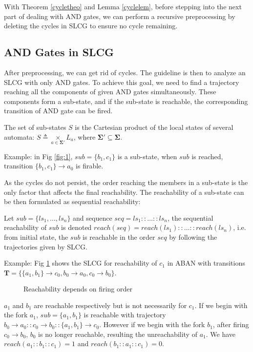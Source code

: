 \documentclass[runningheads]{llncs}
\newcommand{\acm}[3]{#1\rightarrow#2}
\newcommand{\ac}[3]{$#1\rightarrow#2$}
\begin{document}
With Theorem \ref{cycletheo} and Lemma \ref{cyclelem}, before stepping into the next part of dealing with AND gates, we can perform a recursive preprocessing by deleting the cycles in SLCG to ensure no cycle remaining.

\subsection{AND Gates in SLCG}\label{sectAndGates}
After preprocessing, we can get rid of cycles.
The guideline is then to analyze an SLCG with only AND gates.
To achieve this goal, we need to find a trajectory reaching all the components of given AND gates simultaneously.
These components form a sub-state, and if the sub-state is reachable, the corresponding transition of AND gate can be fired. 
\begin{definition}
The set of sub-states $S$ is the Cartesian product of the local states of several automata: $S\triangleq \underset{a\in \mathbf{\Sigma}'}{\times} L_a$, where $\mathbf{\Sigma}'\subseteq \mathbf{\Sigma}$.
\end{definition}

Example: in Fig \ref{fig:1}, $sub=\{ b_1,c_1\}$ is a sub-state, when $sub$ is reached, transition \ac{\{ b_1,c_1\}}{a_0}{a_1} is firable.

As the cycles do not persist, the order reaching the members in a sub-state is the only factor that affects the final reachability. 
The reachability of a sub-state can be then formulated as sequential reachability:
\begin{definition}
Let $sub=\{ls_1,\ldots,ls_n\}$ and sequence $seq=ls_1::\ldots::ls_n$, the sequential reachability of $sub$ is denoted $reach (seq)=reach (ls_1)::\ldots::reach (ls_n)$, i.e. from initial state, the $sub$ is reachable in the order $seq$ by following the trajectories given by SLCG.
\end{definition}

Example: Fig \ref{fig:5} shows the SLCG for reachability of $c_1$ in ABAN with transitions $\mathbf{T}=\{\acm{\{a_1,b_1\}}{c_0}{c_1},\acm{b_0}{a_0}{a_1},\acm{c_0}{b_0}{b_1}\}$.
\begin{figure}[ht]
\centering

\caption{Reachability depends on firing order}
\label{fig:5}
\end{figure}

$a_1$ and $b_1$ are reachable respectively but is not necessarily for $c_1$.
If we begin with the fork $a_1$, $sub=\{a_1,b_1\}$ is reachable with trajectory $\acm{b_0}{a_0}{a_1}::\acm{c_0}{b_0}{b_1}::\acm{\{a_1,b_1\}}{c_0}{c_1}$. 
However if we begin with the fork $b_1$, after firing $\acm{c_0}{b_0}{b_1}$, $b_0$ is no longer reachable, resulting the unreachability of $a_1$.
We have $reach (a_1::b_1::c_1)=1$ and $reach (b_1::a_1::c_1)=0$.
\end{document}

